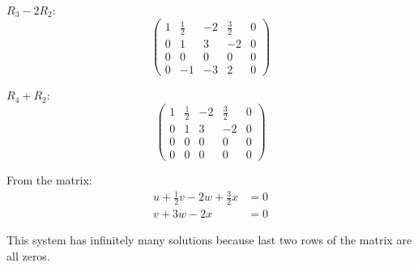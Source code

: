 $R_3 - 2R_2$:
\[
	\left(\begin{array}{cccc|c}
			1 & \frac{1}{2} & -2 & \frac{3}{2} & 0 \\
			0 & 1           & 3  & -2          & 0 \\
			0 & 0           & 0  & 0           & 0 \\
			0 & -1          & -3 & 2           & 0
		\end{array}\right)
\]

$R_4 + R_2$:
\[
	\left(\begin{array}{cccc|c}
			1 & \frac{1}{2} & -2 & \frac{3}{2} & 0 \\
			0 & 1           & 3  & -2          & 0 \\
			0 & 0           & 0  & 0           & 0 \\
			0 & 0           & 0  & 0           & 0
		\end{array}\right)
\]

From the matrix:
\begin{align*}
	u + \frac{1}{2}v - 2w + \frac{3}{2}x & = 0 \\
	v + 3w - 2x                          & = 0
\end{align*}

This system has infinitely many solutions because last two rows of the matrix are all zeros.